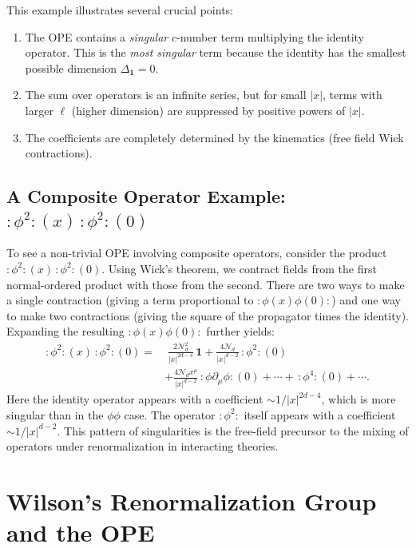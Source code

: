 \documentclass[11pt]{article}
\begin{document}
This example illustrates several crucial points:
\begin{enumerate}
    \item The OPE contains a \emph{singular} $c$-number term multiplying the identity operator. This is the \emph{most singular} term because the identity has the smallest possible dimension $\Delta_{\mathbf{1}} = 0$.
    \item The sum over operators is an infinite series, but for small $|x|$, terms with larger $\ell$ (higher dimension) are suppressed by positive powers of $|x|$.
    \item The coefficients are completely determined by the kinematics (free field Wick contractions).
\end{enumerate}

\subsection*{A Composite Operator Example: $:\phi^2:(x) \, :\phi^2:(0)$}
To see a non-trivial OPE involving composite operators, consider the product $:\phi^2:(x) \, :\phi^2:(0)$. Using Wick's theorem, we contract fields from the first normal-ordered product with those from the second. There are two ways to make a single contraction (giving a term proportional to $:\phi(x)\phi(0):$) and one way to make two contractions (giving the square of the propagator times the identity). Expanding the resulting $:\phi(x)\phi(0):$ further yields:
\begin{equation}
\begin{aligned}
:\phi^2:(x) \, :\phi^2:(0) = & \; \frac{2\mathcal{N}_d^2}{|x|^{2d-4}} \, \mathbf{1} + \frac{4\mathcal{N}_d}{|x|^{d-2}} \, :\phi^2:(0) \\
& + \frac{4\mathcal{N}_d x^\mu}{|x|^{d-2}} \, :\phi\partial_\mu\phi:(0) + \cdots + \, :\phi^4:(0) + \cdots .
\end{aligned}
\end{equation}
Here the identity operator appears with a coefficient $\sim 1/|x|^{2d-4}$, which is more singular than in the $\phi\phi$ case. The operator $:\phi^2:$ itself appears with a coefficient $\sim 1/|x|^{d-2}$. This pattern of singularities is the free-field precursor to the mixing of operators under renormalization in interacting theories.

\section{Wilson's Renormalization Group and the OPE}
\label{sec:RG}
\end{document}
